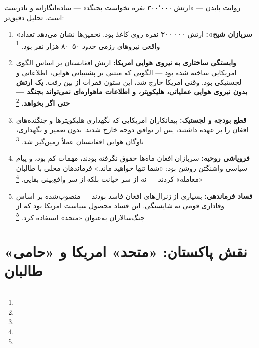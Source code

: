 روایت بایدن — «ارتش ۳۰۰٬۰۰۰ نفره نخواست بجنگد» — ساده‌انگارانه و نادرست است. تحلیل دقیق‌تر:

\begin{tcolorbox}[casebox, title={عوامل واقعی فروپاشی ارتش افغانستان}]
\begin{enumerate}[nosep, label=\textbf{\arabic*.}]
  \item \textbf{«سربازان شبح»:} ارتش ۳۰۰٬۰۰۰ نفره روی کاغذ بود. تخمین‌ها نشان می‌دهد تعداد واقعی نیروهای رزمی حدود ۵۰–۸۰ هزار نفر بود.%
  \footnote{}

  \item \textbf{وابستگی ساختاری به نیروی هوایی امریکا:} ارتش افغانستان بر اساس الگوی امریکایی ساخته شده بود — الگویی که مبتنی بر پشتیبانی هوایی، اطلاعاتی و لجستیکی بود. وقتی امریکا خارج شد، این ستون فقرات از بین رفت. \textbf{یک ارتش بدون نیروی هوایی عملیاتی، هلیکوپتر، و اطلاعات ماهواره‌ای نمی‌تواند بجنگد — حتی اگر بخواهد.}%
  \footnote{}

  \item \textbf{قطع بودجه و لجستیک:} پیمانکاران امریکایی که نگهداری هلیکوپترها و جنگنده‌های افغان را بر عهده داشتند، پس از توافق دوحه خارج شدند. بدون تعمیر و نگهداری، ناوگان هوایی افغانستان عملاً زمین‌گیر شد.%
  \footnote{}

  \item \textbf{فروپاشی روحیه:} سربازان افغان ماه‌ها حقوق نگرفته بودند، مهمات کم بود، و پیام سیاسی واشنگتن روشن بود: «شما تنها خواهید ماند.» فرماندهان محلی با طالبان «معامله» کردند — نه از سر خیانت بلکه از سر واقع‌بینی بقایی.%
  \footnote{}

  \item \textbf{فساد فرماندهی:} بسیاری از ژنرال‌های افغان فاسد بودند — منصوب‌شده بر اساس وفاداری قومی نه شایستگی. این فساد محصول سیاست امریکا بود که از جنگ‌سالاران به‌عنوان «متحد» استفاده کرد.%
  \footnote{}
\end{enumerate}
\end{tcolorbox}

\section{نقش پاکستان: «متحد» امریکا و «حامی» طالبان}
\label{sec:app-afg-pakistan}

